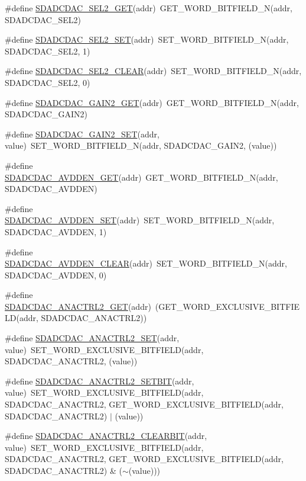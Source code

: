 \begin{DoxyCompactItemize}
\#define \hyperlink{a00568_ada048fbaac39c2abdd81bb4ffbfbac48}{SDADCDAC\_\-SEL2\_\-GET}(addr)~GET\_\-WORD\_\-BITFIELD\_\-N(addr, SDADCDAC\_\-SEL2)
\item 
\#define \hyperlink{a00568_ab28bfd9ef0dcd3bbfcd3a19ffe67392b}{SDADCDAC\_\-SEL2\_\-SET}(addr)~SET\_\-WORD\_\-BITFIELD\_\-N(addr, SDADCDAC\_\-SEL2, 1)
\item 
\#define \hyperlink{a00568_adc1b45a60cf8f22f52eb4fef1655ed8f}{SDADCDAC\_\-SEL2\_\-CLEAR}(addr)~SET\_\-WORD\_\-BITFIELD\_\-N(addr, SDADCDAC\_\-SEL2, 0)
\item 
\#define \hyperlink{a00568_a7d53a04b2e52a2c56b463b10f07c1f26}{SDADCDAC\_\-GAIN2\_\-GET}(addr)~GET\_\-WORD\_\-BITFIELD\_\-N(addr, SDADCDAC\_\-GAIN2)
\item 
\#define \hyperlink{a00568_aa5cc710c957bae540fe8ed5e6ead7f11}{SDADCDAC\_\-GAIN2\_\-SET}(addr, value)~SET\_\-WORD\_\-BITFIELD\_\-N(addr, SDADCDAC\_\-GAIN2, (value))
\item 
\#define \hyperlink{a00568_acdfa99846a90a1cfc3e790045d6a46be}{SDADCDAC\_\-AVDDEN\_\-GET}(addr)~GET\_\-WORD\_\-BITFIELD\_\-N(addr, SDADCDAC\_\-AVDDEN)
\item 
\#define \hyperlink{a00568_a64ba91c52a897d6dfa5c42e0a411dd30}{SDADCDAC\_\-AVDDEN\_\-SET}(addr)~SET\_\-WORD\_\-BITFIELD\_\-N(addr, SDADCDAC\_\-AVDDEN, 1)
\item 
\#define \hyperlink{a00568_a6cf62754ebc34941987d595e7f8cdc18}{SDADCDAC\_\-AVDDEN\_\-CLEAR}(addr)~SET\_\-WORD\_\-BITFIELD\_\-N(addr, SDADCDAC\_\-AVDDEN, 0)
\item 
\#define \hyperlink{a00568_a803001b4a6578d21205eef756edcea4c}{SDADCDAC\_\-ANACTRL2\_\-GET}(addr)~(GET\_\-WORD\_\-EXCLUSIVE\_\-BITFIELD(addr, SDADCDAC\_\-ANACTRL2))
\item 
\#define \hyperlink{a00568_a12ee90d141df804822564b076e28ab30}{SDADCDAC\_\-ANACTRL2\_\-SET}(addr, value)~SET\_\-WORD\_\-EXCLUSIVE\_\-BITFIELD(addr, SDADCDAC\_\-ANACTRL2, (value))
\item 
\#define \hyperlink{a00568_a2b512ca870cd4e8cdf02d1ad8fb7212a}{SDADCDAC\_\-ANACTRL2\_\-SETBIT}(addr, value)~SET\_\-WORD\_\-EXCLUSIVE\_\-BITFIELD(addr, SDADCDAC\_\-ANACTRL2, GET\_\-WORD\_\-EXCLUSIVE\_\-BITFIELD(addr, SDADCDAC\_\-ANACTRL2) $|$ (value))
\item 
\#define \hyperlink{a00568_ac7bc40521540da8a34d6b895ea1515b0}{SDADCDAC\_\-ANACTRL2\_\-CLEARBIT}(addr, value)~SET\_\-WORD\_\-EXCLUSIVE\_\-BITFIELD(addr, SDADCDAC\_\-ANACTRL2, GET\_\-WORD\_\-EXCLUSIVE\_\-BITFIELD(addr, SDADCDAC\_\-ANACTRL2) \& ($\sim$(value)))
\item 

\end{DoxyCompactItemize}
